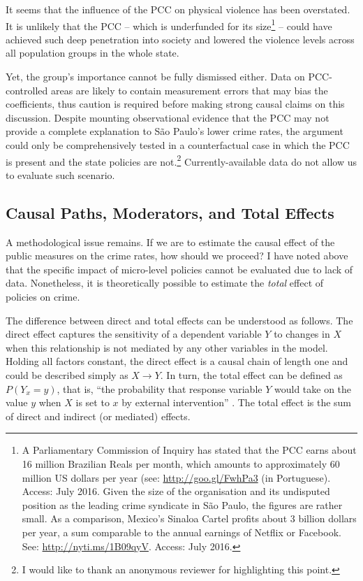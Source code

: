It seems that the influence of the PCC on physical violence has been overstated. It is unlikely that the PCC -- which is underfunded for its size\footnote{A Parliamentary Commission of Inquiry has stated that the PCC earns about 16 million Brazilian Reals per month, which amounts to approximately 60 million US dollars per year (see: \url{http://goo.gl/FwhPa3} (in Portuguese). Access: July 2016. Given the size of the organisation and its undisputed position as the leading crime syndicate in São Paulo, the figures are rather small. As a comparison, Mexico's Sinaloa Cartel profits about 3 billion dollars per year, a sum comparable to the annual earnings of Netflix or Facebook. See: \url{http://nyti.ms/1B09qyV}. Access: July 2016.} -- could have achieved such deep penetration into society and lowered the violence levels across all population groups in the whole state. 

Yet, the group's importance cannot be fully dismissed either. Data on PCC-controlled areas are likely to contain measurement errors that may bias the coefficients, thus caution is required before making strong causal claims on this discussion. Despite mounting observational evidence that the PCC may not provide a complete explanation to São Paulo's lower crime rates, the argument could only be comprehensively tested in a counterfactual case in which the PCC is present and the state policies are not.\footnote{I would like to thank an anonymous reviewer for highlighting this point.} Currently-available data do not allow us to evaluate such scenario.

\subsection{Causal Paths, Moderators, and Total Effects}
\label{sub:causal_paths_moderators_and_total_effects}

A methodological issue remains. If we are to estimate the causal effect of the public measures on the crime rates, how should we proceed? I have noted above that the specific impact of micro-level policies cannot be evaluated due to lack of data. Nonetheless, it is theoretically possible to estimate the \emph{total} effect of policies on crime. 

The difference between direct and total effects can be understood as follows. The direct effect captures the sensitivity of a dependent variable $Y$ to changes in $X$ when this relationship is not mediated by any other variables in the model. Holding all factors constant, the direct effect is a causal chain of length one \citep[p. 160]{sobel1987direct} and could be described simply as $X \rightarrow Y$. In turn, the total effect can be defined as $P(Y_{x} = y)$, that is, ``the probability that response variable $Y$ would take on the value $y$ when $X$ is set to $x$ by external intervention'' \citep[p. 1572]{pearl2001direct}. The total effect is the sum of direct and indirect (or mediated) effects. 

